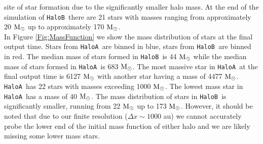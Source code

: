 \documentclass[graphics, twocolumn, usenatbib]{mn2e}
\newcommand{\msolar} {$\rm{M_{\odot}}~$}
\newcommand{\msolarc} {$\rm{M_{\odot}}$}
\newcommand{\ha} {\texttt{HaloA~}}
\newcommand{\hb} {\texttt{HaloB~}}
\begin{document}
site of star formation due to the significantly smaller halo mass. At the end of the simulation of
\hb there are 21 stars with masses ranging from approximately 20 \msolar up to approximately
170 \msolarc.\\
\indent In Figure \ref{Fig:MassFunction} we show the mass distribution of stars at the final
output time. Stars from \ha are binned in blue, stars from \hb are binned in red. The median mass
of stars formed in \hb is 44 \msolar while the median mass of stars formed in \ha is 683 \msolarc.
The most massive star in \ha at the final output time is 6127 \msolar with another star having a mass
of 4477 \msolarc. \ha has 22 stars with masses exceeding 1000 \msolarc. The lowest mass star in
\ha has a mass of 40 \msolarc. The mass distribution of stars in \hb is significantly smaller, running
from 22 \msolar up to 173 \msolarc. However, it should be noted that due to our finite resolution
($\Delta x \sim 1000$ au) we cannot accurately probe the lower end of the initial mass function
of either halo and we are likely missing some lower mass stars. 
\end{document}

